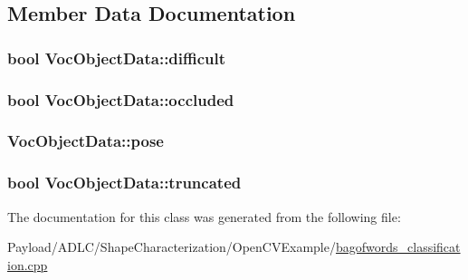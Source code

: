 \subsection{Member Data Documentation}
\hypertarget{classVocObjectData_ab4a2ac2a2d7c32b9e75c9385f967aafc}{
\subsubsection[{difficult}]{\setlength{\rightskip}{0pt plus 5cm}bool Voc\-Object\-Data\-::difficult}}\label{classVocObjectData_ab4a2ac2a2d7c32b9e75c9385f967aafc}
\hypertarget{classVocObjectData_ac7dc3d9150dd2bb0618aece74c51b1ca}{
\subsubsection[{occluded}]{\setlength{\rightskip}{0pt plus 5cm}bool Voc\-Object\-Data\-::occluded}}\label{classVocObjectData_ac7dc3d9150dd2bb0618aece74c51b1ca}
\hypertarget{classVocObjectData_a9113fd23f49bd891070545c4cbe3a50d}{
\subsubsection[{pose}]{ Voc\-Object\-Data\-::pose}}\label{classVocObjectData_a9113fd23f49bd891070545c4cbe3a50d}
\hypertarget{classVocObjectData_a9d030c2d235cdf582fdc3e0cb4bb4d54}{
\subsubsection[{truncated}]{\setlength{\rightskip}{0pt plus 5cm}bool Voc\-Object\-Data\-::truncated}}\label{classVocObjectData_a9d030c2d235cdf582fdc3e0cb4bb4d54}


The documentation for this class was generated from the following file\-:\begin{DoxyCompactItemize}
\item 
Payload/\-A\-D\-L\-C/\-Shape\-Characterization/\-Open\-C\-V\-Example/\hyperlink{bagofwords__classification_8cpp}{bagofwords\-\_\-classification.\-cpp}\end{DoxyCompactItemize}
